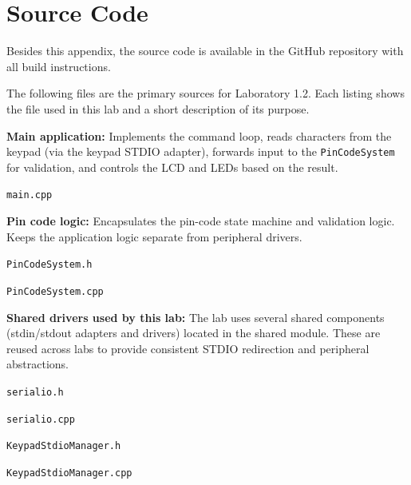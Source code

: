 \appendix

\section{Source Code}
Besides this appendix, the source code is available in the GitHub repository \cite{github} with all build instructions.

The following files are the primary sources for Laboratory 1.2. Each listing shows the file used in this lab and a short description of its purpose.

\textbf{Main application:} Implements the command loop, reads characters from the keypad (via the keypad STDIO adapter), forwards input to the \texttt{PinCodeSystem} for validation, and controls the LCD and LEDs based on the result.

\texttt{main.cpp}


\textbf{Pin code logic:} Encapsulates the pin-code state machine and validation logic. Keeps the application logic separate from peripheral drivers.

\texttt{PinCodeSystem.h}


\texttt{PinCodeSystem.cpp}


\textbf{Shared drivers used by this lab:} The lab uses several shared components (stdin/stdout adapters and drivers) located in the shared module. These are reused across labs to provide consistent STDIO redirection and peripheral abstractions.

\texttt{serialio.h}


\texttt{serialio.cpp}


\texttt{KeypadStdioManager.h}


\texttt{KeypadStdioManager.cpp}


